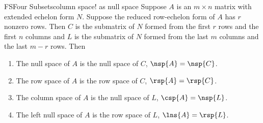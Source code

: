 %
\begin{theorem}{FS}{Four Subsets}{column space! as null space}
Suppose $A$ is an $m\times n$ matrix with extended echelon form $N$.  Suppose the reduced row-echelon form of $A$ has $r$ nonzero rows.  Then $C$ is the submatrix of $N$ formed from the first $r$ rows and the first $n$ columns and $L$ is the submatrix of $N$ formed from the last $m$ columns and the last $m-r$ rows.  Then
%
\begin{enumerate}
\item The null space of $A$ is the null space of $C$, $\nsp{A}=\nsp{C}$.
\item The row space of $A$ is the row space of $C$, $\rsp{A}=\rsp{C}$.
\item The column space of $A$ is the null space of $L$, $\csp{A}=\nsp{L}$.
\item The left null space of $A$ is the row space of $L$, $\lns{A}=\rsp{L}$.
\end{enumerate}
%
\end{theorem}
%
